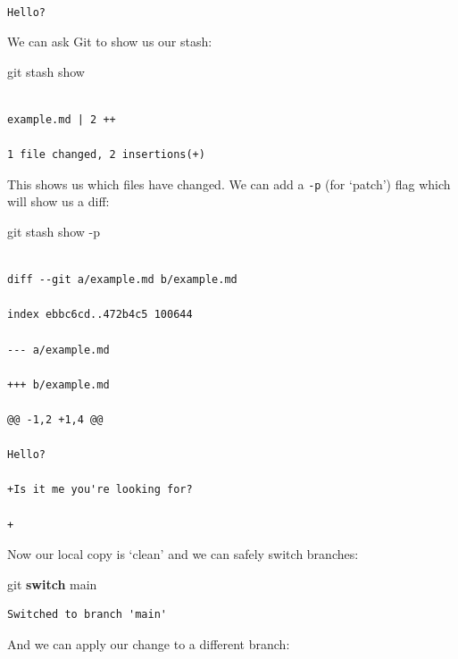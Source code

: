 \documentclass[
  letterpaper,
  DIV=11,
  numbers=noendperiod]{scrartcl}
\newenvironment{Shaded}{\begin{snugshade}}{\end{snugshade}}
\newcommand{\ControlFlowTok}[1]{\textcolor[rgb]{0.00,0.23,0.31}{\textbf{#1}}}
\newcommand{\NormalTok}[1]{\textcolor[rgb]{0.00,0.23,0.31}{#1}}
\newcommand{\SpecialCharTok}[1]{\textcolor[rgb]{0.37,0.37,0.37}{#1}}
\begin{document}
\begin{verbatim}

Hello?
\end{verbatim}

We can ask Git to show us our stash:

\begin{Shaded}
\begin{Highlighting}[]
\NormalTok{git stash show}
\end{Highlighting}
\end{Shaded}

\begin{verbatim}

example.md | 2 ++

1 file changed, 2 insertions(+)
\end{verbatim}

This shows us which files have changed. We can add a \texttt{-p} (for
`patch') flag which will show us a diff:

\begin{Shaded}
\begin{Highlighting}[]
\NormalTok{git stash show }\SpecialCharTok{{-}}\NormalTok{p}
\end{Highlighting}
\end{Shaded}

\begin{verbatim}

diff --git a/example.md b/example.md

index ebbc6cd..472b4c5 100644

--- a/example.md

+++ b/example.md

@@ -1,2 +1,4 @@

Hello?

+Is it me you're looking for?

+
\end{verbatim}

Now our local copy is `clean' and we can safely switch branches:

\begin{Shaded}
\begin{Highlighting}[]
\NormalTok{git }\ControlFlowTok{switch}\NormalTok{ main}
\end{Highlighting}
\end{Shaded}

\begin{verbatim}
Switched to branch 'main'
\end{verbatim}

And we can apply our change to a different branch:
\end{document}

